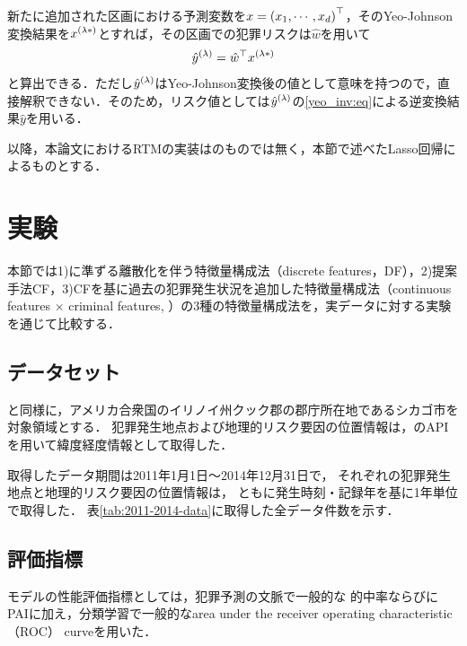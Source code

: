 新たに追加された区画における予測変数を$x={(x_1, \cdots, x_d)}^\top$，そのYeo-Johnson変換結果を${x}^{(\lambda*)}$とすれば，その区画での犯罪リスクは$\hat w$を用いて
\begin{align*}
 {{\hat y}^{(\lambda)}} = {\hat w}^\top {x}^{(\lambda*)}
\end{align*}
と算出できる．ただし${\hat y}^{(\lambda)}$はYeo-Johnson変換後の値として意味を持つので，直接解釈できない．そのため，リスク値としては${\hat y}^{(\lambda)}$の\cref{yeo_inv:eq}による逆変換結果$\hat y$を用いる．

 
以降，本論文におけるRTMの実装は\cite{caplan2015risk}のものでは無く，本節で述べたLasso回帰によるものとする．



\section{実験}

本節では1)\cite{caplan2015risk}に準ずる離散化を伴う特徴量構成法（discrete features，DF），2)提案手法CF，3)CFを基に過去の犯罪発生状況\cite{大山智也2020日本}を追加した特徴量構成法（continuous features $\times$ criminal features, \cfsq）の3種の特徴量構成法を，実データに対する実験を通じて比較する．

\subsection{データセット}
\cite{caplan2015risk}と同様に，アメリカ合衆国のイリノイ州クック郡の郡庁所在地であるシカゴ市を対象領域とする．
犯罪発生地点および地理的リスク要因の位置情報は，\cite{ChicagoDataPortal}のAPIを用いて緯度経度情報として取得した．

取得したデータ期間は2011年1月1日〜2014年12月31日で，
それぞれの犯罪発生地点と地理的リスク要因の位置情報は，
ともに発生時刻・記録年を基に1年単位で取得した．
表\ref{tab:2011-2014-data}に取得した全データ件数を示す．



\subsection{評価指標}\label{sec:criteria}
モデルの性能評価指標としては，犯罪予測の文脈で一般的な
的中率\cite{joshi2020considerationsdevelopingpredictivemodels}ならびに
PAI\cite{chainey2008utility}に加え，分類学習で一般的なarea under the receiver operating characteristic（ROC） curve\cite{islp}を用いた．

